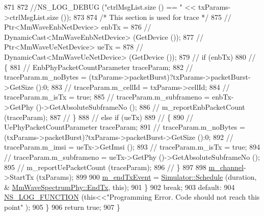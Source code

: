 \begin{DoxyCode}
871 
872                 \textcolor{comment}{//NS\_LOG\_DEBUG ("ctrlMsgList.size () == " << txParams->ctrlMsgList.size ());}
873 
874                 \textcolor{comment}{/* This section is used for trace */}
875 \textcolor{comment}{//              Ptr<MmWaveEnbNetDevice> enbTx =}
876 \textcolor{comment}{//                                      DynamicCast<MmWaveEnbNetDevice> (GetDevice ());}
877 \textcolor{comment}{//              Ptr<MmWaveUeNetDevice> ueTx =}
878 \textcolor{comment}{//                                      DynamicCast<MmWaveUeNetDevice> (GetDevice ());}
879 \textcolor{comment}{//              if (enbTx)}
880 \textcolor{comment}{//              \{}
881 \textcolor{comment}{//                      EnbPhyPacketCountParameter traceParam;}
882 \textcolor{comment}{//                      traceParam.m\_noBytes = (txParams->packetBurst)?txParams->packetBurst->GetSize ():0;}
883 \textcolor{comment}{//                      traceParam.m\_cellId = txParams->cellId;}
884 \textcolor{comment}{//                      traceParam.m\_isTx = true;}
885 \textcolor{comment}{//                      traceParam.m\_subframeno = enbTx->GetPhy ()->GetAbsoluteSubframeNo ();}
886 \textcolor{comment}{//                      m\_reportEnbPacketCount (traceParam);}
887 \textcolor{comment}{//              \}}
888 \textcolor{comment}{//              else if (ueTx)}
889 \textcolor{comment}{//              \{}
890 \textcolor{comment}{//                      UePhyPacketCountParameter traceParam;}
891 \textcolor{comment}{//                      traceParam.m\_noBytes = (txParams->packetBurst)?txParams->packetBurst->GetSize ():0;}
892 \textcolor{comment}{//                      traceParam.m\_imsi = ueTx->GetImsi ();}
893 \textcolor{comment}{//                      traceParam.m\_isTx = true;}
894 \textcolor{comment}{//                      traceParam.m\_subframeno = ueTx->GetPhy ()->GetAbsoluteSubframeNo ();}
895 \textcolor{comment}{//                      m\_reportUePacketCount (traceParam);}
896 \textcolor{comment}{//              \}}
897 
898                 \hyperlink{classns3_1_1MmWaveSpectrumPhy_ac22ba49144bce44918227ffe116a1d0b}{m\_channel}->StartTx (txParams);
899 
900                 \hyperlink{classns3_1_1MmWaveSpectrumPhy_ac51d627851d6d8021cb5404059a78ff2}{m\_endTxEvent} = \hyperlink{classns3_1_1Simulator_a671882c894a08af4a5e91181bf1eec13}{Simulator::Schedule} (duration, &
      \hyperlink{classns3_1_1MmWaveSpectrumPhy_a7874f6ea88d4ea9bcef503e5d55e3e59}{MmWaveSpectrumPhy::EndTx}, \textcolor{keyword}{this});
901         \}
902         \textcolor{keywordflow}{break};
903         \textcolor{keywordflow}{default}:
904                 \hyperlink{log-macros-disabled_8h_a90b90d5bad1f39cb1b64923ea94c0761}{NS\_LOG\_FUNCTION} (\textcolor{keyword}{this}<<\textcolor{stringliteral}{"Programming Error. Code should not reach this point"}
      );
905         \}
906         \textcolor{keywordflow}{return} \textcolor{keyword}{true};
907 \}
\end{DoxyCode}


